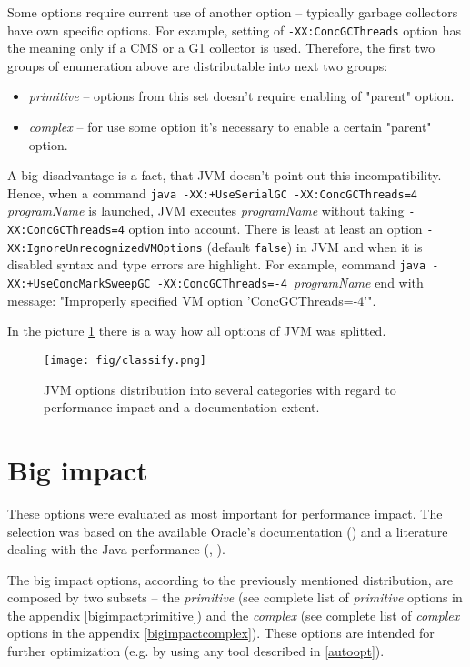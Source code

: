 \documentclass[
  digital, %
  oneside,
  notable, %
  nolof,     %
  nolot     %
]{fithesis3}
\begin{document}
Some options require current use of another option -- typically garbage collectors have own specific options. For example, setting of \texttt{-XX:ConcGCThreads} option has the meaning only if a CMS or a G1 collector is used. Therefore, the first two groups of enumeration above are distributable into next two groups:
\begin{itemize}
	\item \textit{primitive} -- options from this set doesn't require enabling of "parent" option.
	\item \textit{complex} -- for use some option it's necessary to enable a certain "parent" option.
\end{itemize}
A big disadvantage is a fact, that JVM doesn't point out this incompatibility. Hence, when a command \texttt{java -XX:+UseSerialGC -XX:ConcGCThreads=4 }\textit{programName} is launched, JVM executes \textit{programName} without taking \texttt{-XX:ConcGCThreads=4} option into account. There is least at least an option \texttt{-XX:IgnoreUnrecognizedVMOptions} (default \texttt{false}) in JVM and when it is disabled syntax and type errors are highlight. For example, command \texttt{java -XX:+UseConcMarkSweepGC -XX:ConcGCThreads=-4 }\textit{programName} end with message: "Improperly specified VM option 'ConcGCThreads=-4'".

In the picture \ref{classify} there is a way how all options of JVM was splitted.

\begin{figure}[h]
	\centering
	\texttt{[image: fig/classify.png]}
	\caption{JVM options distribution into several categories with regard to performance impact and a documentation extent.}
	\label{classify}
\end{figure}

\section{Big impact}
These options were evaluated as most important for performance impact. The selection was based on the available Oracle's documentation (\cite{java}) and a literature dealing with the Java performance (\cite{scott}, \cite{hunt}).

The big impact options, according to the previously mentioned distribution, are composed by two subsets -- the \textit{primitive} (see complete list of \textit{primitive} options in the appendix \ref{bigimpactprimitive}) and the \textit{complex} (see complete list of \textit{complex} options in the appendix \ref{bigimpactcomplex}). These options are intended for further optimization (e.g. by using any tool described in \ref{autoopt}).
\end{document}
